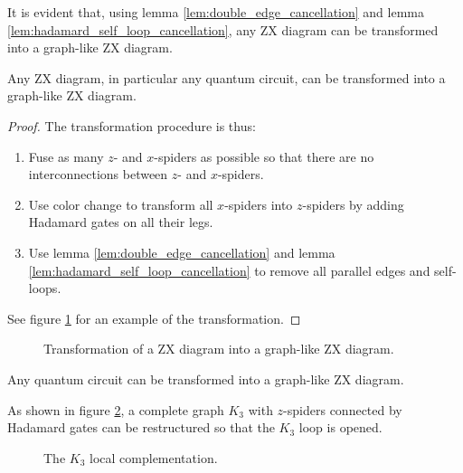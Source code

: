 It is evident that, using lemma \ref{lem:double_edge_cancellation} and lemma \ref{lem:hadamard_self_loop_cancellation}, any ZX diagram can be transformed into a graph-like ZX diagram.

\begin{theorem}
	Any ZX diagram, in particular any quantum circuit, can be transformed into a graph-like ZX diagram.
\end{theorem}

\begin{proof}
	The transformation procedure is thus: 
	\begin{enumerate}
		\item Fuse as many $z$- and $x$-spiders as possible so that there are no interconnections between $z$- and $x$-spiders. 
		\item Use color change to transform all $x$-spiders into $z$-spiders by adding Hadamard gates on all their legs. 
		\item Use lemma \ref{lem:double_edge_cancellation} and lemma \ref{lem:hadamard_self_loop_cancellation} to remove all parallel edges and self-loops.	
	\end{enumerate}
	
	See figure \ref{fig:graph_like_transformation} for an example of the transformation.
\end{proof}

\begin{figure}[ht]
	\centering
	\resizebox{0.8\linewidth}{!}{
		
	}
	\caption{Transformation of a ZX diagram into a graph-like ZX diagram.}
	\label{fig:graph_like_transformation}
\end{figure}


\begin{lemma}
	Any quantum circuit can be transformed into a graph-like ZX diagram.
\end{lemma}

\begin{lemma}
	As shown in figure \ref{fig:k3_local_complementation}, a complete graph $K_{3}$ with 
	$z$-spiders connected by Hadamard gates can be restructured so that the $K_{3}$ loop is opened.
	\begin{figure}
		\centering
		\resizebox{0.8\linewidth}{!}{
			
		}
		\caption{The $K_3$ local complementation.}
		\label{fig:k3_local_complementation}
	\end{figure} 
\end{lemma}\label{lem:k3_local_complementation}


